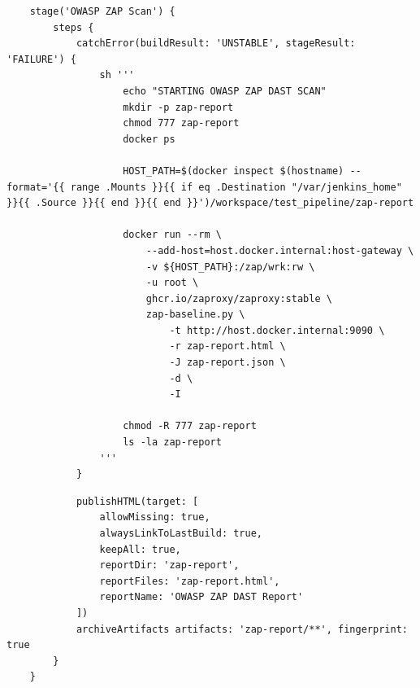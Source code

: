 \begin{listing}
    \caption{OWASP ZAP Scan}
    \label{lst:OWASP-ZAP-Scan}
    \begin{verbatim}
    stage('OWASP ZAP Scan') {
        steps {
            catchError(buildResult: 'UNSTABLE', stageResult: 'FAILURE') {
                sh '''
                    echo "STARTING OWASP ZAP DAST SCAN"
                    mkdir -p zap-report
                    chmod 777 zap-report
                    docker ps
    
                    HOST_PATH=$(docker inspect $(hostname) --format='{{ range .Mounts }}{{ if eq .Destination "/var/jenkins_home" }}{{ .Source }}{{ end }}{{ end }}')/workspace/test_pipeline/zap-report
    
                    docker run --rm \
                        --add-host=host.docker.internal:host-gateway \
                        -v ${HOST_PATH}:/zap/wrk:rw \
                        -u root \
                        ghcr.io/zaproxy/zaproxy:stable \
                        zap-baseline.py \
                            -t http://host.docker.internal:9090 \
                            -r zap-report.html \
                            -J zap-report.json \
                            -d \
                            -I
    
                    chmod -R 777 zap-report
                    ls -la zap-report
                '''
            }
    \end{verbatim}
\end{listing}

\begin{listing}
    \caption{Publish ZAP Report}
    \label{lst:publish-zap-report}
    \begin{verbatim}
            publishHTML(target: [
                allowMissing: true,
                alwaysLinkToLastBuild: true,
                keepAll: true,
                reportDir: 'zap-report',
                reportFiles: 'zap-report.html',
                reportName: 'OWASP ZAP DAST Report'
            ])
            archiveArtifacts artifacts: 'zap-report/**', fingerprint: true
        }
    }
    \end{verbatim}
\end{listing}
\FloatBarrier

